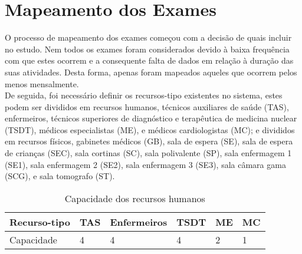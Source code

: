 
%


\epigraphfontsize{\small\itshape}
\setlength\epigraphwidth{12.5cm}
\setlength\epigraphrule{0pt}

\chapter{Mapeamento dos Exames}
\label{cha:mapeamento_dos_exames}


O processo de mapeamento dos exames começou com a decisão de quais incluir no estudo. Nem todos os exames foram considerados devido à baixa frequência com que estes ocorrem e a consequente falta de dados em relação à duração das suas atividades. Desta forma, apenas foram mapeados aqueles que ocorrem pelos menos mensalmente.\\
De seguida, foi necessário definir os recursos-tipo existentes no sistema, estes podem ser divididos em recursos humanos, técnicos auxiliares de saúde (TAS), enfermeiros, técnicos superiores de diagnóstico e terapêutica de medicina nuclear (TSDT), médicos especialistas (ME), e médicos cardiologistas (MC); e divididos em recursos físicos, gabinetes médicos (GB), sala de espera (SE), sala de espera de crianças (SEC), sala cortinas (SC), sala polivalente (SP), sala enfermagem 1 (SE1), sala enfermagem 2 (SE2), sala enfermagem 3 (SE3), sala câmara gama (SCG), e sala tomografo (ST).\\

\begin{table}[H]
\caption{Capacidade dos recursos humanos}
\label{tab:cap_RH}
\begin{tabular}{llllll}
\hline
Recurso-tipo & TAS & Enfermeiros & TSDT & ME & MC \\ \hline
Capacidade   & 4   & 4           & 4    & 2                     & 1
\end{tabular}
\end{table}

